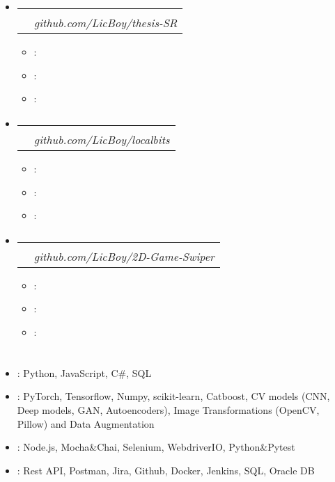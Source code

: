 \documentclass[12pt, letterpaper]{article}
\makeatletter
\newcommand{\resumeItem}[2]{
  \item\small{
    \textbf{#1}{: #2 \vspace{-2pt}}
  }
}
\newcommand{\resumeSubheading}[4]{
  \vspace{-1pt}\item
    \begin{tabular*}{0.97\textwidth}{l@{\extracolsep{\fill}}r}
      \textbf{#1} & #2 \\
      \textit{\small#3} & \textit{\small #4} \\
    \end{tabular*}\vspace{-5pt}
}
\newcommand{\resumeSubHeadingListStart}{\begin{itemize}[leftmargin=*]}
\newcommand{\resumeSubHeadingListEnd}{\end{itemize}}
\newcommand{\resumeItemListStart}{\begin{itemize}}
\newcommand{\resumeItemListEnd}{\end{itemize}\vspace{-5pt}}
\makeatother
\begin{document}
\section{\projectsWord}
   \resumeSubHeadingListStart
    \resumeSubheading
      {\projectFirstName}{\textit{\projectFirstDate}}
      {\projectPositionCreator}{github.com/LicBoy/thesis-SR}
      \resumeItemListStart
        \resumeItem{\projectFirstTitleFirst}{\projectFirstDescFirst}
        \resumeItem{\projectFirstTitleSecond}{\projectFirstDescSecond}
        \resumeItem{\projectFirstTitleThird}{\projectFirstDescThird}
      \resumeItemListEnd

    \resumeSubheading
      {\projectSecondName}{\textit{\projectSecondDate}}
      {\projectPositionCreator}{github.com/LicBoy/localbits}
      \resumeItemListStart
        \resumeItem{\projectSecondTitleFirst}{\projectSecondDescFirst}
        \resumeItem{\projectSecondTitleSecond}{\projectSecondDescSecond}
        \resumeItem{\projectSecondTitleThird}{\projectSecondDescThird}
      \resumeItemListEnd

    \resumeSubheading
      {\projectThirdName}{\textit{\projectThirdDate}}
      {\projectPositionCreator}{github.com/LicBoy/2D-Game-Swiper}
      \resumeItemListStart
        \resumeItem{\projectThirdTitleFirst}{\projectThirdDescFirst}
        \resumeItem{\projectThirdTitleSecond}{\projectThirdDescSecond}
        \resumeItem{\projectThirdTitleThird}{\projectThirdDescThird}
      \resumeItemListEnd
  \resumeSubHeadingListEnd

%
\section{\skillsWord}
 \resumeSubHeadingListStart
   \item{
        \textbf{\skillProgLanguages}{: Python, JavaScript, C\#, SQL}
    }
    \item{
        \textbf{\skillMachineLearning}{: PyTorch, Tensorflow, Numpy, scikit-learn, Catboost, CV models (CNN, Deep models, GAN, Autoencoders), Image Transformations (OpenCV, Pillow) and Data Augmentation}
    }
    \item{
        \textbf{\skillAutoTesting}{: Node.js, Mocha\&Chai, Selenium, WebdriverIO, Python\&Pytest}
    }
    \item{
        \textbf{\skillTools}{: Rest API, Postman, Jira, Github, Docker, Jenkins, SQL, Oracle DB}
    }
 \resumeSubHeadingListEnd


\end{document}
